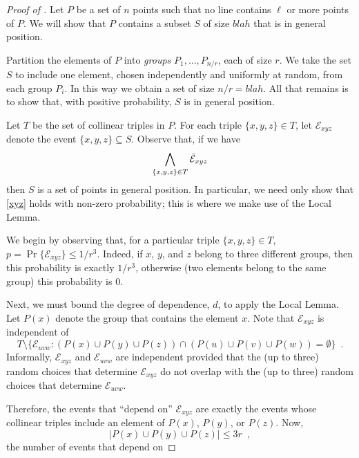 \documentclass{patmorin}
\begin{document}
\begin{proof}[Proof of ]
Let $P$ be a set of $n$ points such that no line contains $\ell$ or more
points of $P$.  
We will show that $P$ contains a subset $S$ of size $blah$ that is in
general position.

Partition the elements of $P$ into \emph{groups} $P_1,\ldots,P_{n/r}$,
each of size $r$. We take the set $S$ to include one element, chosen
independently and uniformly at random, from each group $P_i$.  In this
way we obtain a set of size $n/r=blah$.  All that remains is to show that,
with positive probability, $S$ is in general position.

Let $T$ be the set of collinear triples in $P$.  For each
triple $\{x,y,z\}\in T$, let $\mathcal{E}_{xyz}$ denote the event
$\{x,y,z\}\subseteq S$.  Observe that, if we have 
\begin{equation}
    \bigwedge_{\{x,y,z\}\in T} \bar{\mathcal{E}}_{xyz}
    \eqlabel{xyz}
\end{equation}
then $S$ is a set of points in general position.  In particular, we need
only show that \eqref{xyz} holds with non-zero probability;
this is where we make use of the Local Lemma.

We begin by observing that, for a particular triple $\{x,y,z\}\in T$,
$p=\Pr\{\mathcal{E}_{xyz}\} \le 1/r^{3}$.  Indeed, if $x$, $y$, and $z$
belong to three different groups, then this probability is exactly
$1/r^{3}$, otherwise (two elements belong to the same group) this
probability is 0.

Next, we must bound the degree of dependence, $d$, to apply the Local
Lemma.  Let $P(x)$ denote the group that contains the element $x$.
Note that $\mathcal{E}_{xyz}$ is independent of
\[
   T\setminus \{\mathcal{E}_{uvw} : (P(x)\cup P(y)\cup P(z))
                      \cap (P(u) \cup P(v) \cup P(w)) = \emptyset  \} \enspace .
\]
Informally, $\mathcal{E}_{xyz}$ and $\mathcal{E}_{uvw}$ are independent
provided that the (up to three) random choices that determine
$\mathcal{E}_{xyz}$ do not overlap with the (up to three) random choices
that determine $\mathcal{E}_{uvw}$.

Therefore, the events that ``depend on'' $\mathcal{E}_{xyz}$ are exactly
the events whose collinear triples include an element of $P(x)$, $P(y)$,
or $P(z)$.  Now,
\[
    | P(x)\cup P(y)\cup P(z)| \le 3r \enspace ,
\]
the number of events that depend on 



\end{proof}
\end{document}
